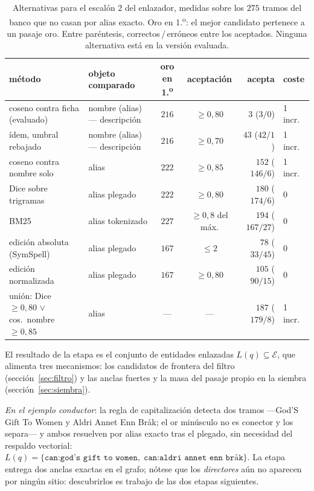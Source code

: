 \documentclass[11pt,a4paper]{article}
\begin{document}
\begin{table}[t]
\centering\footnotesize\setlength{\tabcolsep}{3.5pt}
\caption{Alternativas para el escalón 2 del enlazador, medidas sobre los
$275$ tramos del banco que no casan por alias exacto. \guillemotleft{}Oro en
1.\textsuperscript{o}\guillemotright{}: el mejor candidato pertenece a un pasaje oro.
Entre paréntesis, correctos\,/\,erróneos entre los aceptados. Ninguna
alternativa está en la versión evaluada.}
\label{tab:enlazador-alt}
\scriptsize\setlength{\tabcolsep}{3pt}
\begin{tabular}{llccrl}
\toprule
método & objeto comparado & oro en 1.\textsuperscript{o} & aceptación & acepta & coste\\
\midrule
coseno contra ficha (evaluado) & nombre (alias) --- descripción & $216$ & $\ge 0{,}80$ & $3$ ($3/0$) & 1 incr.\\
ídem, umbral rebajado & nombre (alias) --- descripción & $216$ & $\ge 0{,}70$ & $43$ ($42/1$) & 1 incr.\\
coseno contra nombre solo & alias & $222$ & $\ge 0{,}85$ & $152$ ($146/6$) & 1 incr.\\
Dice sobre trigramas & alias plegado & $222$ & $\ge 0{,}80$ & $180$ ($174/6$) & 0\\
BM25 & alias tokenizado & $227$ & $\ge 0{,}8$ del máx. & $194$ ($167/27$) & 0\\
edición absoluta (SymSpell) & alias plegado & $167$ & $\le 2$ & $78$ ($33/45$) & 0\\
edición normalizada & alias plegado & $167$ & $\ge 0{,}80$ & $105$ ($90/15$) & 0\\
\midrule
unión: Dice $\ge 0{,}80$ $\vee$ cos.\ nombre $\ge 0{,}85$ & alias & --- & --- & $187$ ($179/8$) & 1 incr.\\
\bottomrule
\end{tabular}
\end{table}

El resultado de la etapa es el conjunto de entidades enlazadas
$L(q) \subseteq \mathcal{E}$, que alimenta tres mecanismos: los candidatos
de frontera del filtro (sección~\ref{sec:filtro}) y las anclas fuertes y la
masa del pasaje propio en la siembra (sección~\ref{sec:siembra}).

\emph{En el ejemplo conductor}: la regla de capitalización detecta dos
tramos ---\guillemotleft{}God'S Gift To Women\guillemotright{} y \guillemotleft{}Aldri Annet Enn Bråk\guillemotright{}; el
\guillemotleft{}or\guillemotright{} minúsculo no es conector y los separa--- y ambos resuelven por
alias exacto tras el plegado, sin necesidad del respaldo vectorial:
$L(q) = \{\texttt{can:god's gift to women},\;
\texttt{can:aldri annet enn br\aa k}\}$. La etapa entrega dos anclas
exactas en el grafo; nótese que los \emph{directores} aún no aparecen por
ningún sitio: descubrirlos es trabajo de las dos etapas siguientes.
\end{document}
